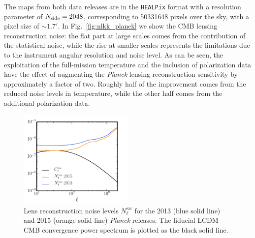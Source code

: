 The maps from both data releases are in the \texttt{HEALPix} format with a resolution parameter of $N_{\rm{side}} = 2048$, corresponding to 50331648 pixels over the sky, with a pixel size of $\sim 1.7'$.  In Fig.~\eqref{fig:nlkk_planck} we show the \gls{CMB} lensing reconstruction noise: the flat part at large scales comes from the contribution of the statistical noise, while the rise at smaller scales represents the limitations due to the instrument angular resolution and noise level. As can be seen, the exploitation of the full-mission temperature and the inclusion of polarization data have the effect of augmenting the \emph{Planck} lensing reconstruction sensitivity by approximately a factor of two. Roughly half of the improvement comes from the reduced noise levels in temperature, while the other half comes from the additional polarization data.

\begin{figure}[t] %
\centering %
\includegraphics[width=0.5\textwidth]{Chapter2/Images/nlkk_planck_13_15}
\caption{Lens reconstruction noise levels $N_{\ell}^{\kappa\kappa}$ for the 2013 (blue solid line) and 2015 (orange solid line) \textit{Planck} releases. The fiducial \gls{LCDM} \gls{CMB} convergence power spectrum is plotted as the black solid line. \label{fig:nlkk_planck}}
\end{figure}


